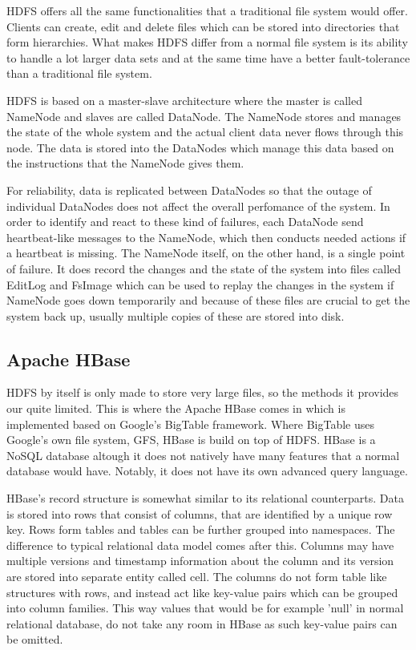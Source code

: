 HDFS offers all the same functionalities that a traditional file system would offer.
Clients can create, edit and delete files which can be stored into directories that form hierarchies.
What makes HDFS differ from a normal file system is its ability to handle a lot larger data sets and at the same time have a better fault-tolerance than a traditional file system.\cite{hdfs}

HDFS is based on a master-slave architecture where the master is called NameNode and slaves are called DataNode.
The NameNode stores and manages the state of the whole system and the actual client data never flows through this node.
The data is stored into the DataNodes which manage this data based on the instructions that the NameNode gives them.\cite{hdfs}

For reliability, data is replicated between DataNodes so that the outage of individual DataNodes does not affect the overall perfomance of the system.
In order to identify and react to these kind of failures, each DataNode send heartbeat-like messages to the NameNode, which then conducts needed actions if a heartbeat is missing.
The NameNode itself, on the other hand, is a single point of failure.
It does record the changes and the state of the system into files called EditLog and FsImage which can be used to replay the changes in the system if NameNode goes down temporarily and because of these files are crucial to get the system back up, usually multiple copies of these are stored into disk. \cite{hdfs}

\subsection{Apache HBase}

HDFS by itself is only made to store very large files, so the methods it provides our quite limited.
This is where the Apache HBase comes in which is implemented based on Google's BigTable framework.
Where BigTable uses Google's own file system, GFS, HBase is build on top of HDFS. 
HBase is a NoSQL database altough it does not natively have many features that a normal database would have.
Notably, it does not have its own advanced query language.\cite{george}

HBase's record structure is somewhat similar to its relational counterparts.
Data is stored into rows that consist of columns, that are identified by a unique row key.
Rows form tables and tables can be further grouped into namespaces.
The difference to typical relational data model comes after this.
Columns may have multiple versions and timestamp information about the column and its version are stored into separate entity called cell.
The columns do not form table like structures with rows, and instead act like key-value pairs which can be grouped into column families.
This way values that would be for example 'null' in normal relational database, do not take any room in HBase as such key-value pairs can be omitted. \cite{george}

